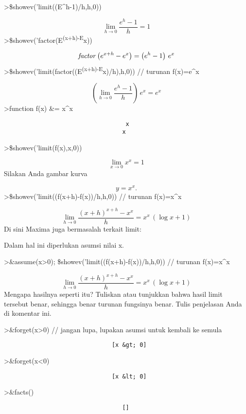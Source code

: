 \documentclass[
]{book}
\begin{document}
\textgreater\$showev('limit((E\^{}h-1)/h,h,0))

\[\lim_{h\rightarrow 0}{\frac{e^{h}-1}{h}}=1\]\textgreater\$showev('factor(E\textsuperscript{(x+h)-E}x))

\[{\it factor}\left(e^{x+h}-e^{x}\right)=\left(e^{h}-1\right)\,e^{x}\]\textgreater\$showev('limit(factor((E\textsuperscript{(x+h)-E}x)/h),h,0)) // turunan f(x)=e\^{}x

\[\left(\lim_{h\rightarrow 0}{\frac{e^{h}-1}{h}}\right)\,e^{x}=e^{x}\]\textgreater function f(x) \&= x\^{}x

\begin{verbatim}
                                   x
                                  x
\end{verbatim}

\textgreater\$showev('limit(f(x),x,0))

\[\lim_{x\rightarrow 0}{x^{x}}=1\]Silakan Anda gambar kurva

\[y=x^x.\]\textgreater\$showev('limit((f(x+h)-f(x))/h,h,0)) // turunan f(x)=x\^{}x

\[\lim_{h\rightarrow 0}{\frac{\left(x+h\right)^{x+h}-x^{x}}{h}}=x^{x}  \,\left(\log x+1\right)\]Di sini Maxima juga bermasalah terkait limit:

Dalam hal ini diperlukan asumsi nilai x.

\textgreater\&assume(x\textgreater0); \$showev('limit((f(x+h)-f(x))/h,h,0)) // turunan f(x)=x\^{}x

\[\lim_{h\rightarrow 0}{\frac{\left(x+h\right)^{x+h}-x^{x}}{h}}=x^{x}  \,\left(\log x+1\right)\]Mengapa hasilnya seperti itu? Tuliskan atau tunjukkan bahwa hasil limit tersebut benar, sehingga benar turunan fungsinya benar. Tulis penjelasan Anda di komentar ini.

\textgreater\&forget(x\textgreater0) // jangan lupa, lupakan asumsi untuk kembali ke semula

\begin{verbatim}
                               [x &gt; 0]
\end{verbatim}

\textgreater\&forget(x\textless0)

\begin{verbatim}
                               [x &lt; 0]
\end{verbatim}

\textgreater\&facts()

\begin{verbatim}
                                  []
\end{verbatim}
\end{document}
